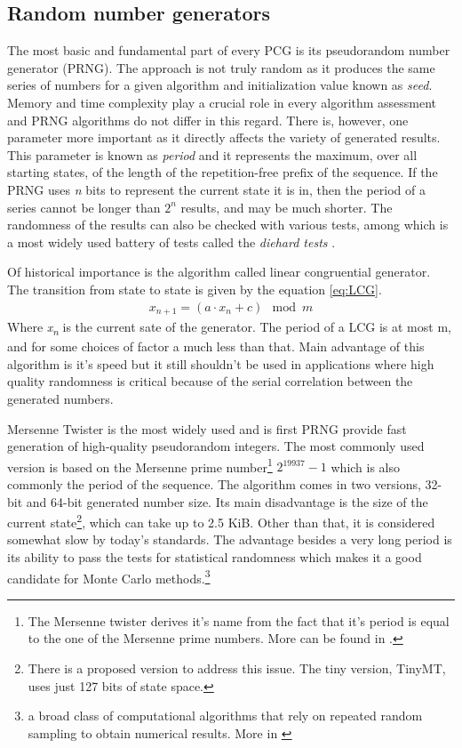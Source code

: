 \documentclass[journal]{IEEEtran}
\begin{document}
\subsection{Random number generators}
The most basic and fundamental part of every PCG is its pseudorandom number generator (PRNG). The approach is not truly random as it produces the same series of numbers for a given algorithm and initialization value known as \textit{seed}. Memory and time complexity play a crucial role in every algorithm assessment and PRNG algorithms do not differ in this regard. There is, however, one parameter more important as it directly affects the variety of generated results. This parameter is known as \textit{period} and it represents the maximum, over all starting states, of the length of the repetition-free prefix of the sequence. If the PRNG uses \textit{n} bits to represent the current state it is in, then the period of a series cannot be longer than $2^{n}$ results, and may be much shorter. The randomness of the results can also be checked with various tests, among which is a most widely used battery of tests called the \textit{diehard tests} \cite{diehard}.
\par
Of historical importance is the algorithm called linear congruential generator. The transition from state to state is given by the equation \ref{eq:LCG}.
\begin{gather}
\label{eq:LCG}
x_{n+1}=(a \cdot{x_n} + c)\mod{m}
\end{gather}
Where \textit{x\textsubscript{n}} is the current sate of the generator. The period of a LCG is at most m, and for some choices of factor a much less than that. Main advantage of this algorithm is it's speed but it still shouldn't be used in applications where high quality randomness is critical because of the serial correlation between the generated numbers.\par
Mersenne Twister is the most widely used and is first PRNG provide fast generation of high-quality pseudorandom integers. The most commonly used version is based on the Mersenne prime number\footnote{The Mersenne twister derives it's name from the fact that it's period is equal to the one of the Mersenne prime numbers. More can be found in \cite{mersennePrime}.} $2^{19937}-1$ which is also commonly the period of the sequence. The algorithm comes in two versions, 32-bit and 64-bit generated number size. Its main disadvantage is the size of the current state\footnote{There is a proposed version to address this issue. The tiny version, TinyMT, uses just 127 bits of state space.}, which can take up to  2.5 KiB. Other than that, it is considered somewhat slow by today's standards. The advantage besides a very long period is its ability to pass the \cite{diehard} tests for statistical randomness which makes it a good candidate for Monte Carlo methods.\footnote{a broad class of computational algorithms that rely on repeated random sampling to obtain numerical results. More in \cite{monteCarlo}}\par
\end{document}
